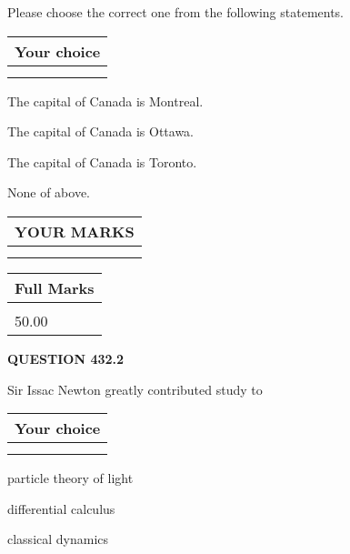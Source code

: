 \documentclass[12pt]{article}
\begin{document}
  
Please choose the correct one from the following statements.
  
  
\noindent\hspace{3.0in} \begin{tabular}{|l|}
\hline
Your choice \\
\hline
 \\ 
 \\ 
\hline
\end{tabular}
  
  
 
 
The capital of Canada is Montreal.
 
 
The capital of Canada is Ottawa.
 
 
The capital of Canada is Toronto.
 
 
 None of above.
 
 
  
\vspace{0.2in}
  
\noindent\begin{tabular}{|l|}
\hline
 YOUR MARKS  \\
\hline
 \\ 
 \\ 
\hline
\end{tabular}
\hspace{0.05in} \begin{tabular}{|l|}
\hline
 Full Marks  \\
\hline
 \\ 
50.00 \\
\hline
\end{tabular}
{\textbf{\Large{QUESTION
432.2 
}}}
  
  
Sir Issac Newton greatly contributed study to
  
  
\noindent\hspace{3.0in} \begin{tabular}{|l|}
\hline
Your choice \\
\hline
 \\ 
 \\ 
\hline
\end{tabular}
  
  
 
 
particle theory of light
 
 
differential calculus
 
 
classical dynamics
 
\end{document}
